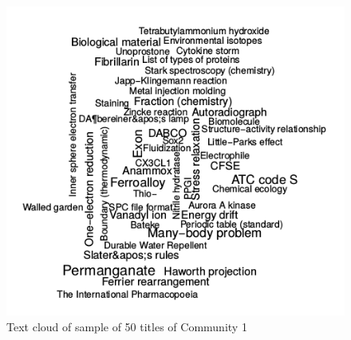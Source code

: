 \documentclass[paper=a4, fontsize=11pt]{scrartcl} %
\begin{document}
\begin{figure}[H]
	\centering
	\includegraphics[scale=0.75,keepaspectratio]{TextCloud1}
	\caption{Text cloud of sample of 50 titles of Community 1}
	\label{TextCloud1}
\end{figure}
\end{document}
